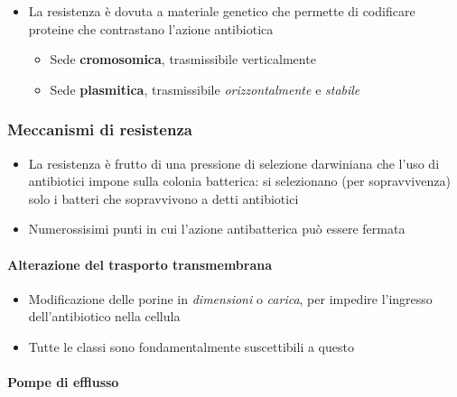 \documentclass[italian,]{article}
\providecommand{\tightlist}{%
  \setlength{\itemsep}{0pt}\setlength{\parskip}{0pt}}
\begin{document}
\begin{itemize}
\tightlist
\item
  La resistenza è dovuta a materiale genetico che permette di codificare
  proteine che contrastano l'azione antibiotica

  \begin{itemize}
  \tightlist
  \item
    Sede \textbf{cromosomica}, trasmissibile verticalmente
  \item
    Sede \textbf{plasmitica}, trasmissibile \emph{orizzontalmente} e
    \emph{stabile}
  \end{itemize}
\end{itemize}

\hypertarget{meccanismi-di-resistenza}{%
\subsubsection{Meccanismi di
resistenza}\label{meccanismi-di-resistenza}}

\begin{itemize}
\tightlist
\item
  La resistenza è frutto di una pressione di selezione darwiniana che
  l'uso di antibiotici impone sulla colonia batterica: si selezionano
  (per sopravvivenza) solo i batteri che sopravvivono a detti
  antibiotici
\item
  Numerossisimi punti in cui l'azione antibatterica può essere fermata
\end{itemize}

\hypertarget{alterazione-del-trasporto-transmembrana}{%
\paragraph{Alterazione del trasporto
transmembrana}\label{alterazione-del-trasporto-transmembrana}}

\begin{itemize}
\tightlist
\item
  Modificazione delle porine in \emph{dimensioni} o \emph{carica}, per
  impedire l'ingresso dell'antibiotico nella cellula
\item
  Tutte le classi sono fondamentalmente suscettibili a questo
\end{itemize}

\hypertarget{pompe-di-efflusso}{%
\paragraph{Pompe di efflusso}\label{pompe-di-efflusso}}
\end{document}
